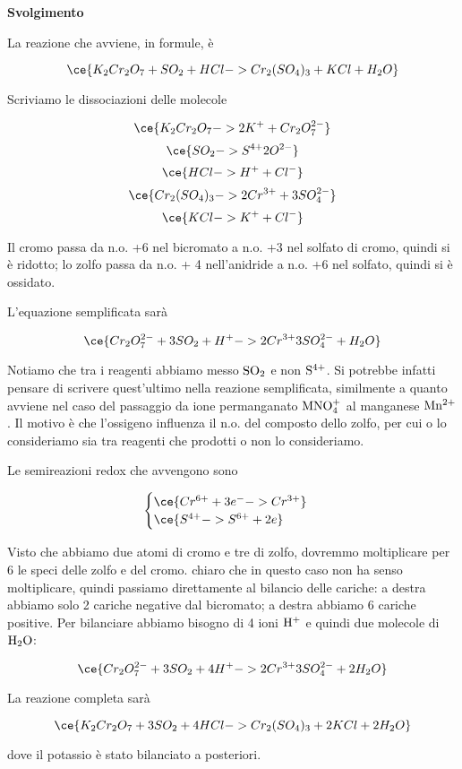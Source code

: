 \large\textbf{Svolgimento}\normalsize

\vspace{0.2cm}La reazione che avviene, in formule, è

$$\ce{K_2Cr_2O_7 + SO_2 + HCl -> Cr_2(SO_4)_3 + KCl + H_2O}$$

Scriviamo le dissociazioni delle molecole

$$\ce{K_2Cr_2O_7 -> 2K^+ + Cr_2O_7^{2-}}$$
$$\ce{SO_2 -> S^{4+} 2O^{2-}}$$
$$\ce{HCl -> H^+ + Cl^-}$$
$$\ce{Cr_2(SO_4)_3 -> 2Cr^{3+} + 3SO_4^{2-}}$$
$$\ce{KCl -> K^+ + Cl^-}$$

Il cromo passa da n.o. +6 nel bicromato a n.o. +3 nel solfato di cromo, quindi si è ridotto; lo zolfo passa da n.o. + 4 nell'anidride a n.o. +6 nel solfato, quindi si è ossidato.

L'equazione semplificata sarà

$$\ce{Cr_2O_7^{2-} + 3SO_2 + H^+ -> 2Cr^{3+} 3SO_4^{2-} + H_2O}$$

Notiamo che tra i reagenti abbiamo messo $\rm SO_2$ e non $\rm S^{4+}$. Si potrebbe infatti pensare di scrivere quest'ultimo nella reazione semplificata, similmente a quanto avviene nel caso del passaggio da ione permanganato $\rm MNO_4^{+}$ al manganese $\rm Mn^{2+}$. Il motivo è che l'ossigeno influenza il n.o. del composto dello zolfo, per cui o lo consideriamo sia tra reagenti che prodotti o non lo consideriamo.

Le semireazioni redox che avvengono sono

$$\begin{cases}
    \ce{Cr^{6+} +3e^- -> Cr^{3+}}\\
    \ce{S^{4+} -> S^{6+} +2e}
\end{cases}$$

Visto che abbiamo due atomi di cromo e tre di zolfo, dovremmo moltiplicare per 6 le speci delle zolfo e del cromo. \E chiaro che in questo caso non ha senso moltiplicare, quindi passiamo direttamente al bilancio delle cariche: a destra abbiamo solo 2 cariche negative dal bicromato; a destra abbiamo 6 cariche positive. Per bilanciare abbiamo bisogno di 4 ioni $\rm H^+$ e quindi due molecole di $\rm H_2O$:

$$\ce{Cr_2O_7^{2-} + 3SO_2 + 4H^+ -> 2Cr^{3+} 3SO_4^{2-} + 2H_2O}$$

La reazione completa sarà

$$\ce{K_2Cr_2O_7 + 3SO_2 + 4HCl -> Cr_2(SO_4)_3 + 2KCl + 2H_2O}$$

dove il potassio è stato bilanciato a posteriori.

